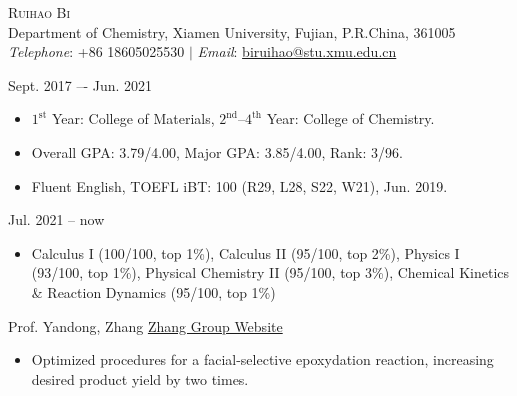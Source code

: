 \pagestyle{plain}
\thispagestyle{empty} %
{\begin{center}
\Large{\textsc{Ruihao Bi}} \\ \normalsize {Department of Chemistry, Xiamen University, Fujian, P.R.China, 361005} \\ \textit{Telephone}: {+86 18605025530} $|$ \textit{Email}: {\href{mailto:biruihao@stu.xmu.edu.cn}{biruihao@stu.xmu.edu.cn}} 
\end{center}}

\sectionrule
{}

{ \hfill {Sept. 2017 –- Jun. 2021}}

\begin{itemize}
\item $\mathrm{1^{st}}$ Year: College of Materials, $\mathrm{2^{nd}}$--$\mathrm{4^{th}}$ Year:	College of Chemistry.
\item Overall GPA: 3.79/4.00, Major GPA: 3.85/4.00, Rank: 3/96.
\item Fluent English, TOEFL iBT: 100 (R29, L28, S22, W21), Jun. 2019.
\end{itemize}

{ \hfill {Jul. 2021 -- now}}


\noindent{}
\begin{itemize}

\item Calculus I (100/100, top 1\%), Calculus II (95/100, top 2\%), Physics I (93/100, top 1\%), Physical Chemistry II (95/100, top 3\%), Chemical Kinetics \& Reaction Dynamics (95/100, top 1\%)
\end{itemize}

\vspace{5mm}
\sectionrule
{}


{\noindent Prof. Yandong, Zhang  \hfill \href{https://zhanglab.xmu.edu.cn/}{Zhang Group Website}}


\begin{itemize}
\item{Optimized procedures for a facial-selective epoxydation reaction, increasing desired product yield by two times.}
\end{itemize}

